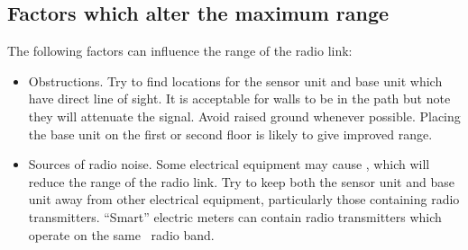 
\subsection{Factors which alter the maximum range}
The following factors can influence the range of the radio link:
\begin{itemize}
\item Obstructions. Try to find locations for the sensor unit and base
  unit which have direct line of sight. It is acceptable for walls to
  be in the path but note they will attenuate the signal. Avoid raised
  ground whenever possible. Placing the base unit on the first or
  second floor is likely to give improved range.
\item Sources of radio noise. Some electrical equipment may cause
  \rfi, which will reduce the range of the radio link. Try to keep
  both the sensor unit and base unit away from other electrical
  equipment, particularly those containing radio
  transmitters. ``Smart'' electric meters can contain radio
  transmitters which operate on the same  \ism\ radio band.
\end{itemize}
